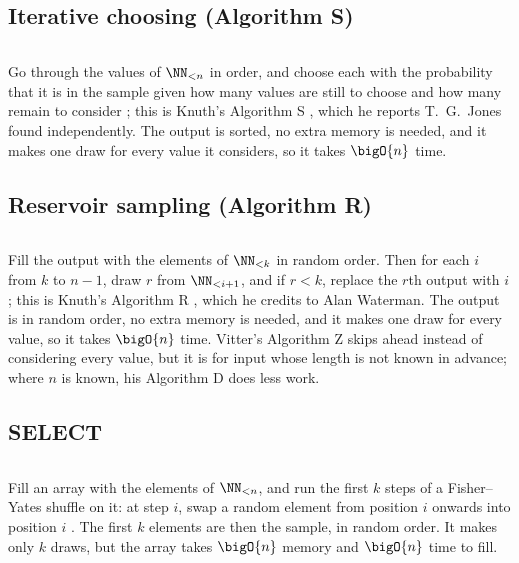 \documentclass[letterpaper,11pt]{article}
\begin{document}
\subsection{Iterative choosing (Algorithm S)}
\inputminted{Python}{code/iterativechoose.py}
Go through the values of \(\NN_{<n}\) in order, and choose each with
the probability that it is in the sample given how many values are
still to choose and how many remain to consider
\cite[Method 1, p.~391]{fanetal}; this is Knuth's Algorithm S
\cite[\S 3.4.2]{taocp2}, which he reports T.~G.~Jones found
independently. The output is sorted, no extra memory is needed, and it
makes one draw for every value it considers, so it takes \(\bigO{n}\)
time.

\subsection{Reservoir sampling (Algorithm R)}
\inputminted{Python}{code/reservoirsample.py}
Fill the output with the elements of \(\NN_{<k}\) in random order.
Then for each \(i\) from \(k\) to \(n - 1\), draw \(r\) from
\(\NN_{<i + 1}\), and if \(r < k\), replace the \(r\)th output with
\(i\); this is Knuth's Algorithm R \cite[\S 3.4.2]{taocp2}, which he
credits to Alan Waterman. The output is in
random order, no extra memory is needed, and it makes one draw for
every value, so it takes \(\bigO{n}\) time. Vitter's Algorithm Z
\cite{vitterZ} skips ahead instead of considering every value, but it
is for input whose length is not known in advance; where \(n\) is
known, his Algorithm D does less work.

\subsection{SELECT}
\inputminted{Python}{code/select.py}
Fill an array with the elements of \(\NN_{<n}\), and run the first
\(k\) steps of a Fisher--Yates shuffle on it: at step \(i\), swap a
random element from position \(i\) onwards into position \(i\)
\cite[\S 6.3, p.~303]{goodman}. The first \(k\) elements are then the
sample, in
random order. It makes only \(k\) draws, but the array takes
\(\bigO{n}\) memory and \(\bigO{n}\) time to fill.
\end{document}
